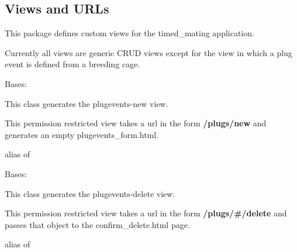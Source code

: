 \documentclass[letterpaper,10pt,english]{sphinxmanual}
\begin{document}
\subsection{Views and URLs}
\label{api:id10}\label{api:module-mousedb.timed_mating.views}
This package defines custom views for the timed\_mating application.

Currently all views are generic CRUD views except for the view in which a plug event is defined from a breeding cage.


\begin{fulllineitems}
\label{api:mousedb.timed_mating.views.PlugEventsCreate}
Bases: {\hyperref[api:mousedb.views.RestrictedCreateView]{}}

This class generates the plugevents-new view.

This permission restricted view takes a url in the form \textbf{/plugs/new} and generates an empty plugevents\_form.html.


\begin{fulllineitems}
\label{api:mousedb.timed_mating.views.PlugEventsCreate.model}
alias of 

\end{fulllineitems}


\end{fulllineitems}



\begin{fulllineitems}
\label{api:mousedb.timed_mating.views.PlugEventsDelete}
Bases: {\hyperref[api:mousedb.views.RestrictedDeleteView]{}}

This class generates the plugevents-delete view.

This permission restricted view takes a url in the form \textbf{/plugs/\#/delete} and passes that object to the confirm\_delete.html page.


\begin{fulllineitems}
\label{api:mousedb.timed_mating.views.PlugEventsDelete.model}
alias of 

\end{fulllineitems}


\end{fulllineitems}
\end{document}
